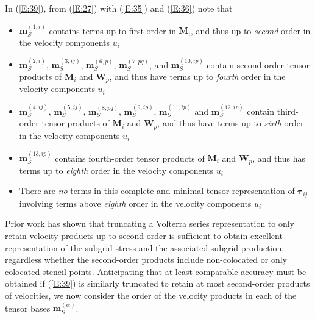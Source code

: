 In (\ref{E:39}), from (\ref{E:27}) with (\ref{E:35}) and (\ref{E:36}) note that
%
\begin{itemize}
%
	\item	$\mathbf{m}^{(1,i)}_{S}$ contains terms up to first order in $\mathbf{M}_{i}$, and thus up to \textit{second} order in the velocity components $u_i$ 
%	
	\item	$\mathbf{m}^{(2,i)}_{S}$, $\mathbf{m}^{(3,ij)}_{S}$, $\mathbf{m}^{(6,p)}_{S}$, $\mathbf{m}^{(7,pq)}_{S}$, and $\mathbf{m}^{(10,ip)}_{S}$  contain second-order tensor products of  $\mathbf{M}_{i}$  and $\mathbf{W}_{p}$, and thus have terms up to \textit{fourth} order in the velocity components  $u_i$ 
%	
	\item	 $\mathbf{m}^{(4,ij)}_{S}$, $\mathbf{m}^{(5,ij)}_{S}$, $\mathbf{m}^{(8,pq)}_{S}$, $\mathbf{m}^{(9,ip)}_{S}$, $\mathbf{m}^{(11,ip)}_{S}$ and $\mathbf{m}^{(12,ip)}_{S}$ contain third-order tensor products of $\mathbf{M}_{i}$  and $\mathbf{W}_{p}$, and thus have terms up to \textit{sixth} order in the velocity components $u_i$ 
%	
	\item	 $\mathbf{m}^{(13,ip)}_{S}$  contains fourth-order tensor products of $\mathbf{M}_{i}$  and $\mathbf{W}_{p}$, and thus has terms up to \textit{eighth} order in the velocity components $u_i$
%	
	\item	There are \textit{no} terms in this complete and minimal tensor representation of $\mathbf{\tau}_{ij}$  involving terms above \textit{eighth} order in the velocity components $u_i$
%
\end{itemize}
%
%   


Prior work has shown that truncating a Volterra series representation to only retain velocity products up to second order is sufficient to obtain excellent representation of the subgrid stress and the associated subgrid production, regardless whether the second-order products include non-colocated or only colocated stencil points.  Anticipating that at least comparable accuracy must be obtained if (\ref{E:39}) is similarly truncated to retain at most second-order products of velocities, we now consider the order of the velocity products in each of the tensor bases  $\mathbf{m}^{(\alpha)}_{S}$.

